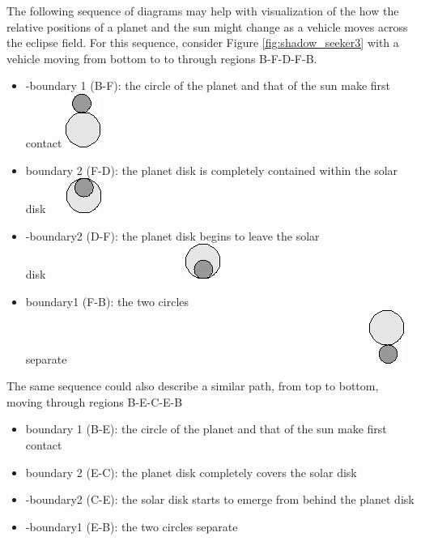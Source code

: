    The following sequence of diagrams may help with visualization of the how
   the relative positions of a planet and the sun might change as a vehicle
   moves across the eclipse field.  For this sequence, consider Figure
   \ref{fig:shadow_seeker3} with a vehicle moving from bottom to to through
   regions B-F-D-F-B.
   \begin{itemize}


    \item {}-boundary 1 (B-F): the circle of the planet and
   that of the sun make first contact
   \includegraphics{figs/shadow/shadow_seeker_fig4.jpg}

    \item boundary 2 (F-D): the planet disk is completely contained
   within the solar disk~~~
   \includegraphics{figs/shadow/shadow_seeker_fig5.jpg}

    \item {}-boundary2 (D-F): the planet disk begins to leave the
   solar disk~~~~~~~~~~~~~~~~~~~~~~~~
   \includegraphics{figs/shadow/shadow_seeker_fig6.jpg}

    \item boundary1 (F-B): the two circles separate~~~~~~~~~~~~~~~~~~~~~~~~~~~~~~~~~~
   ~~~~~~~~~~~~~~~~~~
   \includegraphics{figs/shadow/shadow_seeker_fig7.jpg}

   \end{itemize}
   \bigskip

   The same sequence could also describe a similar path, from top to bottom,
   moving through regions B-E-C-E-B

   \begin{itemize}

   \item boundary 1 (B-E): the circle of the planet and that of the sun make
   first contact

   \item boundary 2 (E-C): the planet disk completely covers the solar disk

   \item {}-boundary2 (C-E): the solar disk starts to emerge from behind the
   planet disk

   \item {}-boundary1 (E-B): the two circles separate

   \end{itemize}



